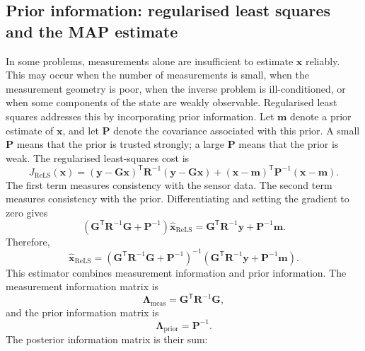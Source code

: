 \documentclass[graybox,envcountchap]{style/SNmono}
\begin{document}
\subsection{Prior information: regularised least squares and the MAP estimate}
In some problems, measurements alone are insufficient to estimate $\mathbf{x}$ reliably. This may occur when the number of measurements is small, when the measurement geometry is poor, when the inverse problem is ill-conditioned, or when some components of the state are weakly observable. Regularised least squares addresses this by incorporating prior information. Let $\mathbf{m}$ denote a prior estimate of $\mathbf{x}$, and let $\mathbf{P}$ denote the covariance associated with this prior. A small $\mathbf{P}$ means that the prior is trusted strongly; a large $\mathbf{P}$ means that the prior is weak. The regularised least-squares cost is
\begin{equation}
J_{\mathrm{ReLS}}(\mathbf{x}) = \left( \mathbf{y} - \mathbf{G}\mathbf{x} \right)^{\mathsf T} \mathbf{R}^{-1} \left( \mathbf{y} - \mathbf{G}\mathbf{x} \right) + \left( \mathbf{x} - \mathbf{m} \right)^{\mathsf T} \mathbf{P}^{-1} \left( \mathbf{x} - \mathbf{m} \right).
\end{equation}
The first term measures consistency with the sensor data. The second term measures consistency with the prior. Differentiating and setting the gradient to zero gives
\begin{equation}
\left(
\mathbf{G}^{\mathsf T}
\mathbf{R}^{-1}
\mathbf{G}
+
\mathbf{P}^{-1}
\right)
\widehat{\mathbf{x}}_{\mathrm{ReLS}}
=
\mathbf{G}^{\mathsf T}
\mathbf{R}^{-1}
\mathbf{y}
+
\mathbf{P}^{-1}
\mathbf{m}.
\end{equation}
Therefore,
\begin{equation}
\widehat{\mathbf{x}}_{\mathrm{ReLS}}
=
\left(
\mathbf{G}^{\mathsf T}
\mathbf{R}^{-1}
\mathbf{G}
+
\mathbf{P}^{-1}
\right)^{-1}
\left(
\mathbf{G}^{\mathsf T}
\mathbf{R}^{-1}
\mathbf{y}
+
\mathbf{P}^{-1}
\mathbf{m}
\right).
\end{equation}
This estimator combines measurement information and prior information. The measurement information matrix is
\begin{equation}
\mathbf{\Lambda}_{\mathrm{meas}}
=
\mathbf{G}^{\mathsf T}
\mathbf{R}^{-1}
\mathbf{G},
\end{equation}
and the prior information matrix is
\begin{equation}
\mathbf{\Lambda}_{\mathrm{prior}}
=
\mathbf{P}^{-1}.
\end{equation}
The posterior information matrix is their sum:
\end{document}
